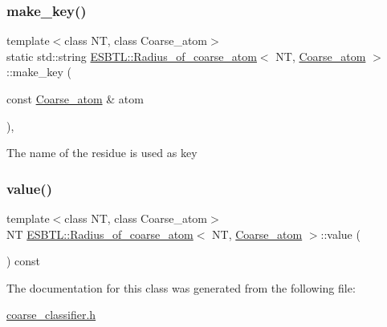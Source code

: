 \subsubsection{\texorpdfstring{make\+\_\+key()}{make\_key()}}
{\footnotesize\ttfamily template$<$class NT, class Coarse\+\_\+atom$>$ \\
static std\+::string \hyperlink{classESBTL_1_1Radius__of__coarse__atom}{E\+S\+B\+T\+L\+::\+Radius\+\_\+of\+\_\+coarse\+\_\+atom}$<$ NT, \hyperlink{classESBTL_1_1Coarse__atom}{Coarse\+\_\+atom} $>$\+::make\+\_\+key (\begin{DoxyParamCaption}\item[{const \hyperlink{classESBTL_1_1Coarse__atom}{Coarse\+\_\+atom} \&}]{atom }\end{DoxyParamCaption})\hspace{0.3cm}{\ttfamily [inline]}, {\ttfamily [static]}}

The name of the residue is used as key \mbox{\label{classESBTL_1_1Radius__of__coarse__atom_af7e4c44f516494dab26eb9bf1aad4340}} 
\subsubsection{\texorpdfstring{value()}{value()}}
{\footnotesize\ttfamily template$<$class NT, class Coarse\+\_\+atom$>$ \\
NT \hyperlink{classESBTL_1_1Radius__of__coarse__atom}{E\+S\+B\+T\+L\+::\+Radius\+\_\+of\+\_\+coarse\+\_\+atom}$<$ NT, \hyperlink{classESBTL_1_1Coarse__atom}{Coarse\+\_\+atom} $>$\+::value (\begin{DoxyParamCaption}{ }\end{DoxyParamCaption}) const\hspace{0.3cm}{\ttfamily [inline]}}



The documentation for this class was generated from the following file\+:\begin{DoxyCompactItemize}
\item 
\hyperlink{coarse__classifier_8h}{coarse\+\_\+classifier.\+h}\end{DoxyCompactItemize}
